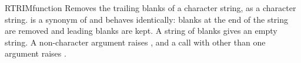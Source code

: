 \begin{XbaseEntry}{RTRIM}{function}
Removes the trailing blanks of a character string, as a character string.
\Syntax
{}
\Usage
{} is a synonym of  and behaves identically: blanks at the end of the string are removed and leading blanks are kept. A string of blanks gives an empty string. A non-character argument raises , and a call with other than one argument raises .
\Examples
{}
\end{XbaseEntry}

